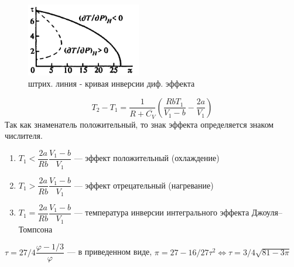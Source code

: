 \begin{figure}
	\includegraphics[width=50mm]{ris22_3.png}
	\caption{штрих. линия - кривая инверсии диф. эффекта}
\end{figure}
$$T_2-T_1=\dfrac{1}{R+\overline{C_V}}\left(\dfrac{RbT_1}{V_1-b}-\dfrac{2a}{V_1}\right)$$
Так как знаменатель положительный, то знак эффекта определяется знаком числителя.
\begin{enumerate}
	\item $T_1<\dfrac{2a}{Rb}\dfrac{V_1-b}{V_1}$ --- эффект положительный (охлаждение)
	\item $T_1>\dfrac{2a}{Rb}\dfrac{V_1-b}{V_1}$ --- эффект отрецательный (нагревание)
	\item $T_1=\dfrac{2a}{Rb}\dfrac{V_1-b}{V_1}$ --- температура инверсии интегрального эффекта Джоуля--Томпсона
\end{enumerate}
$\tau=27/4\dfrac{\varphi-1/3}{\varphi}$ --- в приведенном виде, $\pi=27-16/27\tau^2\Leftrightarrow\tau=3/4\sqrt{81-3\pi}$